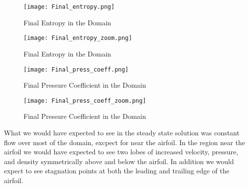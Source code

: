 \documentclass[a4paper,12pt,titlepage]{article}
\newcommand{\scale}{0.5}
\begin{document}
\begin{figure}[H]
  \begin{center}
    \texttt{[image: Final\_entropy.png]}
    \caption{Final Entropy in the Domain}
  \end{center}
\end{figure}

\begin{figure}[H]
  \begin{center}
    \texttt{[image: Final\_entropy\_zoom.png]}
    \caption{Final Entropy in the Domain}
  \end{center}
\end{figure}

\begin{figure}[H]
  \begin{center}
    \texttt{[image: Final\_press\_coeff.png]}
    \caption{Final Pressure Coefficient in the Domain}
  \end{center}
\end{figure}

\begin{figure}[H]
  \begin{center}
    \texttt{[image: Final\_press\_coeff\_zoom.png]}
    \caption{Final Pressure Coefficient in the Domain}
  \end{center}
\end{figure}

What we would have expected to see in the steady state solution was constant flow over most of the domain, excpect for near the airfoil.  In the region near the airfoil we would have expected to see two lobes of increased velocity, pressure, and density symmetrically above and below the airfoil.  In addition we would expect to see stagnation points at both the leading and trailing edge of the airfoil.  
\end{document}
